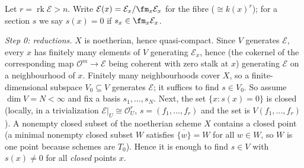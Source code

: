 \documentclass[11pt]{article}
\begin{document}
\pf
Let $r=\operatorname{rk}\mathcal E>n$. Write $\mathcal E(x)=\mathcal E_x/\fm_x\mathcal E_x$ for the fibre ($\cong k(x)^r$); for a section $s$ we say $s(x)=0$ if $s_x\in\fm_x\mathcal E_x$.

\emph{Step 0: reductions.} $X$ is noetherian, hence quasi-compact. Since $V$ generates $\mathcal E$, every $x$ has finitely many elements of $V$ generating $\mathcal E_x$, hence (the cokernel of the corresponding map $\mathcal O^m\to\mathcal E$ being coherent with zero stalk at $x$) generating $\mathcal E$ on a neighbourhood of $x$. Finitely many neighbourhoods cover $X$, so a finite-dimensional subspace $V_0\subseteq V$ generates $\mathcal E$; it suffices to find $s\in V_0$. So assume $\dim V=N<\infty$ and fix a basis $s_1,\dots,s_N$. Next, the set $\{x: s(x)=0\}$ is closed (locally, in a trivialization $\mathcal E|_U\cong\mathcal O_U^r$, $s=(f_1,\dots,f_r)$ and the set is $V(f_1,\dots,f_r)$). A nonempty closed subset of the noetherian scheme $X$ contains a closed point (a minimal nonempty closed subset $W$ satisfies $\overline{\{w\}}=W$ for all $w\in W$, so $W$ is one point because schemes are $T_0$). Hence it is enough to find $s\in V$ with $s(x)\ne0$ for all \emph{closed} points $x$.
\end{document}
